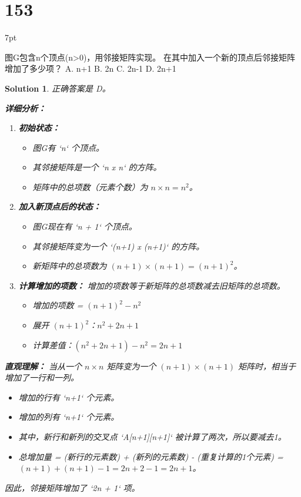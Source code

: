 \documentclass[UTF8]{report}
\newtheorem{solution}{Solution}
\theoremstyle{MyLineTheoremStyle} %
\theoremstyle{MyBlockTheoremStyle} %
\theoremstyle{MySubsubsectionStyle} %
\newenvironment{graybox}{%
        \def\FrameCommand{%
        \hspace{1pt}%
        {\color{gray}\small \vrule width 2pt}%
        {\color{graybox_color}\vrule width 4pt}%
        \colorbox{graybox_color}%
        }%
        \MakeFramed{\advance\hsize-\width\FrameRestore}%
        \noindent\hspace{-4.55pt}%
        \begin{adjustwidth}{}{7pt}%
        \vspace{2pt}\vspace{2pt}%
        }
        {%
        \vspace{2pt}\end{adjustwidth}\endMakeFramed%
        }
\begin{document}
\section*{153}
\begin{graybox}
图G包含n个顶点(n>0)，用邻接矩阵实现。
在其中加入一个新的顶点后邻接矩阵增加了多少项？
A. n+1
B. 2n
C. 2n-1
D. 2n+1
\end{graybox}

\begin{solution}
正确答案是 D。

\textbf{详细分析：}

\begin{enumerate}
    \item \textbf{初始状态：}
    \begin{itemize}
        \item 图G有 `n` 个顶点。
        \item 其邻接矩阵是一个 `n x n` 的方阵。
        \item 矩阵中的总项数（元素个数）为 $n \times n = n^2$。
    \end{itemize}

    \item \textbf{加入新顶点后的状态：}
    \begin{itemize}
        \item 图G现在有 `n + 1` 个顶点。
        \item 其邻接矩阵变为一个 `(n+1) x (n+1)` 的方阵。
        \item 新矩阵中的总项数为 $(n+1) \times (n+1) = (n+1)^2$。
    \end{itemize}

    \item \textbf{计算增加的项数：}
    增加的项数等于新矩阵的总项数减去旧矩阵的总项数。
    \begin{itemize}
        \item 增加的项数 = $(n+1)^2 - n^2$
        \item 展开 $(n+1)^2$：$n^2 + 2n + 1$
        \item 计算差值：$(n^2 + 2n + 1) - n^2 = 2n + 1$
    \end{itemize}
\end{enumerate}

\textbf{直观理解：}
当从一个 $n \times n$ 矩阵变为一个 $(n+1) \times (n+1)$ 矩阵时，相当于增加了一行和一列。
\begin{itemize}
    \item 增加的行有 `n+1` 个元素。
    \item 增加的列有 `n+1` 个元素。
    \item 其中，新行和新列的交叉点 `A[n+1][n+1]` 被计算了两次，所以要减去1。
    \item 总增加量 = (新行的元素数) + (新列的元素数) - (重复计算的1个元素) = $(n+1) + (n+1) - 1 = 2n + 2 - 1 = 2n + 1$。
\end{itemize}

因此，邻接矩阵增加了 `2n + 1` 项。
\end{solution}
\end{document}
